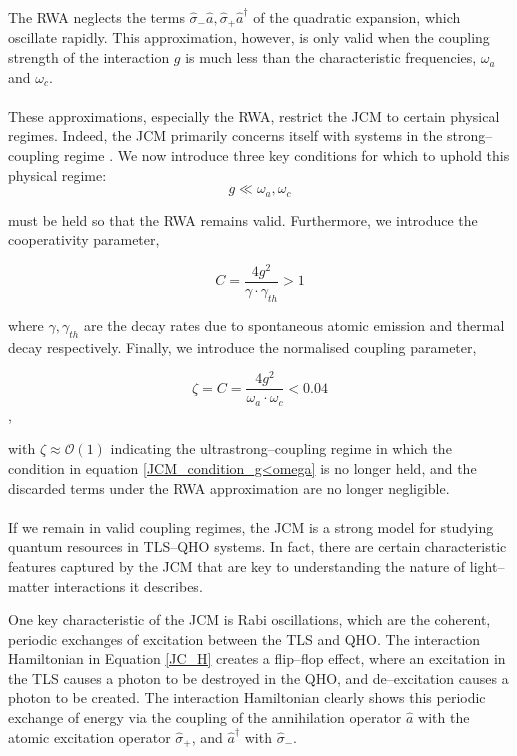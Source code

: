 \documentclass[11pt]{article}
\begin{document}
The RWA neglects the terms $\hat{\sigma}_{-}\hat{a}, \hat{\sigma}_{+}\hat{a}^\dagger$ of the quadratic expansion, which oscillate rapidly. This approximation, however, is only valid when the coupling strength of the interaction $g$ is much less than the characteristic frequencies, $\omega_a$ and $\omega_c$. \\
\\
These approximations, especially the RWA, restrict the JCM to certain physical regimes. Indeed, the JCM primarily concerns itself with systems in the strong--coupling regime \cite{General2024-JCM_relevance}. We now introduce three key conditions for which to uphold this physical regime:
\begin{equation} \label{JCM_condition_g<omega}
    g \ll \omega_a, \omega_c 
\end{equation} 

must be held so that the RWA remains valid. Furthermore, we introduce the cooperativity parameter,

\begin{equation} \label{JCM_condition_cooperativity}
    C = \frac{4g^2}{\gamma\cdot\gamma_{\scriptscriptstyle th}} > 1
\end{equation}

where $\gamma, \gamma_{\scriptscriptstyle th}$ are the decay rates due to spontaneous atomic emission and thermal decay respectively. Finally, we introduce the normalised coupling parameter, 

\begin{equation} \label{JCM_condition_norm_coupling}
    \zeta = C = \frac{4g^2}{\omega_a\cdot\omega_c} < 0.04
\end{equation}, 

with $\zeta \approx \mathcal{O}(1)$ indicating the ultrastrong--coupling regime in which the condition in equation \eqref{JCM_condition_g<omega} is no longer held, and the discarded terms under the RWA approximation are no longer negligible.\\
\\
If we remain in valid coupling regimes, the JCM is a strong model for studying quantum resources in TLS--QHO systems. In fact, there are certain characteristic features captured by the JCM that are key to understanding the nature of light--matter interactions it describes. 

One key characteristic of the JCM is Rabi oscillations, which are the coherent, periodic exchanges of excitation between the TLS and QHO. The interaction Hamiltonian in Equation \eqref{JC_H} creates a flip--flop effect, where an excitation in the TLS causes a photon to be destroyed in the QHO, and de--excitation causes a photon to be created. The interaction Hamiltonian clearly shows this periodic exchange of energy via the coupling of the annihilation operator $\hat{a}$ with the atomic excitation operator $\hat{\sigma}_+$, and $\hat{a}^\dagger$ with $\hat{\sigma}_-$.
\end{document}

